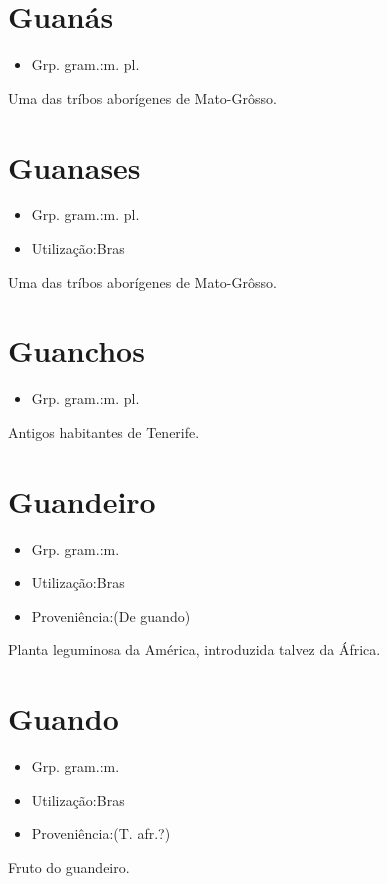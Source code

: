 \section{Guanás}
\begin{itemize}
\item {Grp. gram.:m. pl.}
\end{itemize}
Uma das tríbos aborígenes de Mato-Grôsso.
\section{Guanases}
\begin{itemize}
\item {Grp. gram.:m. pl.}
\end{itemize}
\begin{itemize}
\item {Utilização:Bras}
\end{itemize}
Uma das tríbos aborígenes de Mato-Grôsso.
\section{Guanchos}
\begin{itemize}
\item {Grp. gram.:m. pl.}
\end{itemize}
Antigos habitantes de Tenerife.
\section{Guandeiro}
\begin{itemize}
\item {Grp. gram.:m.}
\end{itemize}
\begin{itemize}
\item {Utilização:Bras}
\end{itemize}
\begin{itemize}
\item {Proveniência:(De \textunderscore guando\textunderscore )}
\end{itemize}
Planta leguminosa da América, introduzida talvez da África.
\section{Guando}
\begin{itemize}
\item {Grp. gram.:m.}
\end{itemize}
\begin{itemize}
\item {Utilização:Bras}
\end{itemize}
\begin{itemize}
\item {Proveniência:(T. afr.?)}
\end{itemize}
Fruto do guandeiro.
